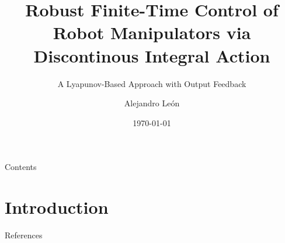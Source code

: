 \documentclass[aspectratio=169,xcolor=dvipsnames]{beamer}
\title{Robust Finite-Time Control of Robot Manipulators via Discontinous Integral Action}
\subtitle{A Lyapunov-Based Approach with Output Feedback}
\author{Alejandro León}
\institute
{
    Instituto de Ingeniería \\
    Universidad Nacional Autónoma de México %
}
\date{\today} %
\begin{document}
\begin{frame}
    \titlepage
\end{frame}

\begin{frame}{Contents}
    \tableofcontents
\end{frame}

\section{Introduction}


%

% 

% 


\begin{frame}{References}
    \footnotesize
    
    
\end{frame}

\end{document}
